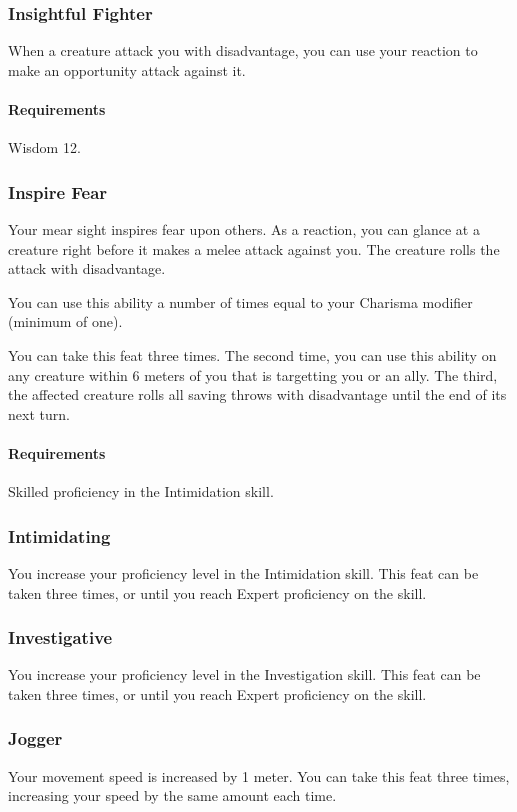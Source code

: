 \subsubsection{Insightful Fighter} \label{feat::insightfulfighter}
    When a creature attack you with disadvantage, you can use your reaction to make an opportunity attack against it.
    \paragraph{Requirements} Wisdom 12.
\subsubsection{Inspire Fear} \label{feat::inspirefear}
    Your mear sight inspires fear upon others.
    As a reaction, you can glance at a creature right before it makes a melee attack against you.
    The creature rolls the attack with disadvantage.

    You can use this ability a number of times equal to your Charisma modifier (minimum of one).

    You can take this feat three times.
    The second time, you can use this ability on any creature within 6 meters of you that is targetting you or an ally.
    The third, the affected creature rolls all saving throws with disadvantage until the end of its next turn.
    \paragraph{Requirements} Skilled proficiency in the Intimidation skill.
\subsubsection{Intimidating} \label{feat::intimidating}
    You increase your proficiency level in the Intimidation skill.
    This feat can be taken three times, or until you reach Expert proficiency on the skill.
\subsubsection{Investigative} \label{feat::investigative}
    You increase your proficiency level in the Investigation skill.
    This feat can be taken three times, or until you reach Expert proficiency on the skill.
\subsubsection{Jogger} \label{feat::jogger}
    Your movement speed is increased by 1 meter.
    You can take this feat three times, increasing your speed by the same amount each time.


